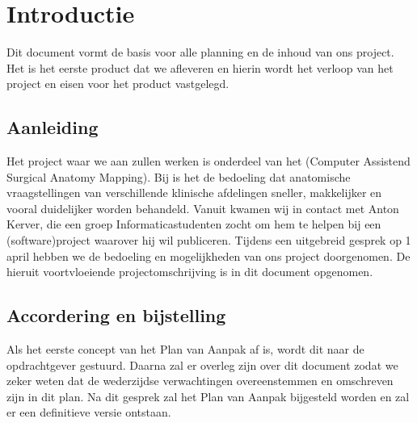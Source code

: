 \section{Introductie}

Dit document vormt de basis voor alle planning en de inhoud van ons project.
Het is het eerste product dat we afleveren en hierin wordt het verloop van het project en eisen voor het product vastgelegd.

\subsection{Aanleiding}

Het project waar we aan zullen werken is onderdeel van het \casamproject (Computer Assistend Surgical Anatomy Mapping). 
Bij \casam is het de bedoeling dat anatomische vraagstellingen van verschillende klinische afdelingen sneller, makkelijker en vooral duidelijker worden behandeld.
Vanuit \casam kwamen wij in contact met Anton Kerver, die een groep Informaticastudenten zocht om hem te helpen bij een (software)project waarover hij wil publiceren.
Tijdens een uitgebreid gesprek op 1 april hebben we de bedoeling en mogelijkheden van ons project doorgenomen.
De hieruit voortvloeiende projectomschrijving is in dit document opgenomen.

\subsection{Accordering en bijstelling}

Als het eerste concept van het Plan van Aanpak af is, wordt dit naar de opdrachtgever gestuurd.
Daarna zal er overleg zijn over dit document zodat we zeker weten dat de wederzijdse verwachtingen overeenstemmen en omschreven zijn in dit plan.
Na dit gesprek zal het Plan van Aanpak bijgesteld worden en zal er een definitieve versie ontstaan.

